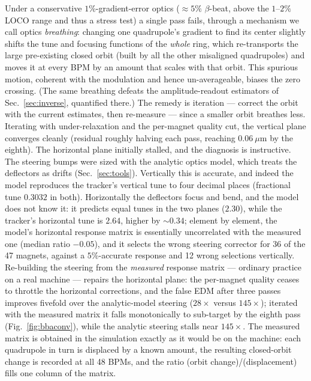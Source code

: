 \documentclass[aps,prab,reprint,superscriptaddress,nofootinbib]{revtex4-2}
\begin{document}
Under a conservative $1\%$-gradient-error optics ($\approx\!5\%$ $\beta$-beat,
above the $1$--$2\%$ LOCO range and thus a stress test)
a single pass fails, through a mechanism we call optics \emph{breathing}:
changing one quadrupole's gradient to find its center slightly shifts the tune
and focusing functions of the \emph{whole} ring, which re-transports the large
pre-existing closed orbit (built by all the other misaligned quadrupoles) and
moves it at every BPM by an amount that scales with that orbit.  This spurious
motion, coherent with the modulation and hence un-averageable, biases the zero
crossing.  (The same breathing defeats the amplitude-readout estimators of
Sec.~\ref{sec:inverse}, quantified there.)  The remedy is iteration --- correct
the orbit with the current estimates, then re-measure --- since a smaller orbit
breathes
less.  Iterating with under-relaxation and the per-magnet quality cut, the
vertical plane converges cleanly (residual roughly halving each pass, reaching
$0.06~\mu$m by the eighth).  The horizontal plane initially stalled, and the
diagnosis is instructive.  The steering bumps were sized with the analytic optics model,
which treats the deflectors as drifts (Sec.~\ref{sec:tools}).  Vertically
this is accurate, and indeed the model reproduces the tracker's vertical
tune to four decimal places (fractional tune $0.3032$ in both).
Horizontally the deflectors focus and bend, and the model does not know it:
it predicts equal tunes in the two planes ($2.30$), while the tracker's
horizontal tune is $2.64$, higher by $\sim\!0.34$; element by element, the
model's
horizontal response matrix is essentially uncorrelated with the measured one
(median ratio $-0.05$), and it selects the wrong steering corrector for 36 of
the 47 magnets, against a $5\%$-accurate response and 12 wrong selections
vertically.  Re-building the steering from the \emph{measured} response
matrix --- ordinary practice on a real machine --- repairs the horizontal
plane: the per-magnet quality ceases to throttle the horizontal corrections,
and the false EDM after three passes improves fivefold over the
analytic-model steering ($28\times$ versus $145\times$); iterated with the
measured matrix it falls monotonically to sub-target by the eighth pass
(Fig.~\ref{fig:bbaconv}), while the analytic steering stalls near $145\times$.
The measured matrix is
obtained in the simulation exactly as it would be on the machine: each
quadrupole in turn is displaced by a known amount, the resulting
closed-orbit change is recorded at all 48 BPMs, and the ratio
(orbit change)/(displacement) fills one column of the matrix.
\end{document}

